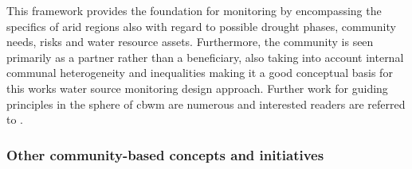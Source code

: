 {%

This framework provides the foundation for monitoring by encompassing the specifics of arid regions also with regard to possible drought phases, community needs, risks and water resource assets. Furthermore, the community is seen primarily as a partner rather than a beneficiary, also taking into account internal communal heterogeneity and inequalities making it a good conceptual basis for this works water source monitoring design approach.
Further work for guiding principles in the sphere of \acrshort*{cbwm} are numerous and interested readers are referred to \autocite{westonCommunityBasedWaterMonitoring2015}.


\subsubsection*{Other community-based concepts and initiatives} %

}
